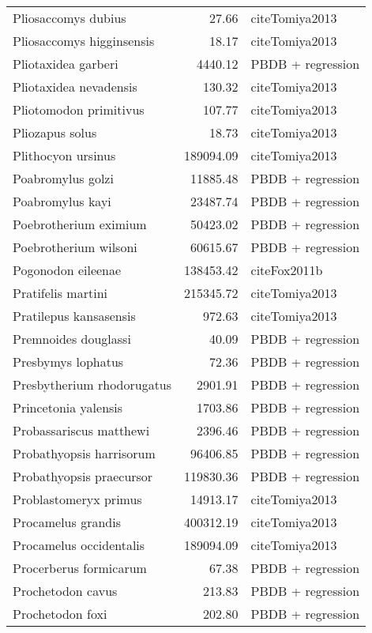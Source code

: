 \begin{table}[ht]
\begin{tabular}{lrl}
  Pliosaccomys dubius & 27.66 & cite{Tomiya2013} \\ 
  Pliosaccomys higginsensis & 18.17 & cite{Tomiya2013} \\ 
  Pliotaxidea garberi & 4440.12 & PBDB + regression \\ 
  Pliotaxidea nevadensis & 130.32 & cite{Tomiya2013} \\ 
  Pliotomodon primitivus & 107.77 & cite{Tomiya2013} \\ 
  Pliozapus solus & 18.73 & cite{Tomiya2013} \\ 
  Plithocyon ursinus & 189094.09 & cite{Tomiya2013} \\ 
  Poabromylus golzi & 11885.48 & PBDB + regression \\ 
  Poabromylus kayi & 23487.74 & PBDB + regression \\ 
  Poebrotherium eximium & 50423.02 & PBDB + regression \\ 
  Poebrotherium wilsoni & 60615.67 & PBDB + regression \\ 
  Pogonodon eileenae & 138453.42 & cite{Fox2011b} \\ 
  Pratifelis martini & 215345.72 & cite{Tomiya2013} \\ 
  Pratilepus kansasensis & 972.63 & cite{Tomiya2013} \\ 
  Premnoides douglassi & 40.09 & PBDB + regression \\ 
  Presbymys lophatus & 72.36 & PBDB + regression \\ 
  Presbytherium rhodorugatus & 2901.91 & PBDB + regression \\ 
  Princetonia yalensis & 1703.86 & PBDB + regression \\ 
  Probassariscus matthewi & 2396.46 & PBDB + regression \\ 
  Probathyopsis harrisorum & 96406.85 & PBDB + regression \\ 
  Probathyopsis praecursor & 119830.36 & PBDB + regression \\ 
  Problastomeryx primus & 14913.17 & cite{Tomiya2013} \\ 
  Procamelus grandis & 400312.19 & cite{Tomiya2013} \\ 
  Procamelus occidentalis & 189094.09 & cite{Tomiya2013} \\ 
  Procerberus formicarum & 67.38 & PBDB + regression \\ 
  Prochetodon cavus & 213.83 & PBDB + regression \\ 
  Prochetodon foxi & 202.80 & PBDB + regression \\ 

\end{tabular}
\end{table}
